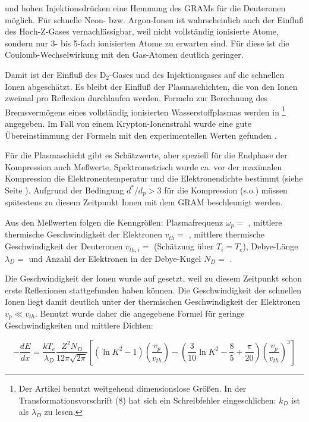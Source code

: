 und hohen Injektionsdrücken eine Hemmung des GRAMs für die Deuteronen
möglich. Für schnelle Neon- bzw. Argon-Ionen ist wahrscheinlich auch
der Einfluß des Hoch-Z-Gases vernachlässigbar, weil nicht vollständig
ionisierte Atome, sondern nur 3- bis 5-fach ionisierten Atome zu
erwarten sind. Für diese ist die Coulomb-Wechselwirkung mit den
Gas-Atomen deutlich geringer.
\par
Damit ist der Einfluß des D$_2$-Gases und des Injektionsgases auf die
schnellen Ionen abgeschätzt. Es bleibt der Einfluß der Plasmaschichten,
die von den Ionen zweimal pro Reflexion durchlaufen werden. Formeln zur
Berechnung des Bremsvermögens eines vollständig ionisierten
Wasserstoffplasmas werden in \cite{peter:91}\footnote{Der Artikel
benutzt weitgehend dimensionslose Größen. In der
Transformationsvorschrift (8) hat sich ein Schreibfehler
eingeschlichen: $k_D$ ist als $\lambda_D$ zu lesen.} angegeben. Im Fall
von einem Krypton-Ionenstrahl wurde eine gute Übereinstimmung der
Formeln mit den experimentellen Werten gefunden \cite{jacoby:95}.
\par
Für die Plasmaschicht gibt es Schätzwerte, aber speziell für die
Endphase der Kompression auch Meßwerte. Spektrometrisch wurde ca.
 vor der maximalen Kompression die Elektronentemperatur
 und die Elektronendichte  bestimmt (siehe Seite \pageref{fig:spektrum}).
Aufgrund der Bedingung $d^\ast / d_p > 3$ für die Kompression (s.o.)
müssen spätestens zu diesem Zeitpunkt Ionen mit dem GRAM beschleunigt
werden.
\par
Aus den Meßwerten folgen die Kenngrößen:
  Plasmafrequenz $\omega_p =$ ,
  mittlere thermische Geschwindigkeit der Elektronen $v_{th} =$ ,
  mittlere thermische Geschwindigkeit der Deuteronen $v_{th,i} =$ 
  (Schätzung über $T_i = T_e$),
  Debye-Länge $\lambda_D =$  und
  Anzahl der Elektronen in der Debye-Kugel $N_D =$ .
\par
Die Geschwindigkeit der Ionen wurde auf 
gesetzt, weil zu diesem Zeitpunkt schon erste Reflexionen stattgefunden
haben können. Die Geschwindigkeit der schnellen Ionen liegt damit
deutlich unter der thermischen Geschwindigkeit der Elektronen $v_p \ll
v_{th}$. Benutzt wurde daher die angegebene Formel für geringe
Geschwindigkeiten und mittlere Dichten:
\par
$$ - \frac{dE}{dx} = \frac{kT_e}{\lambda_D}
\frac{Z^2N_D}{12\pi\sqrt{2\pi}} \left[ (\ln K^2 -1)\left(
\frac{v_p}{v_{th}} \right) - \left( \frac{3}{10} \ln K^2 -
\frac{8}{5} + \frac{\pi}{20} \right) \left( \frac{v_p}{v_{th}}
\right)^3 \right] $$

